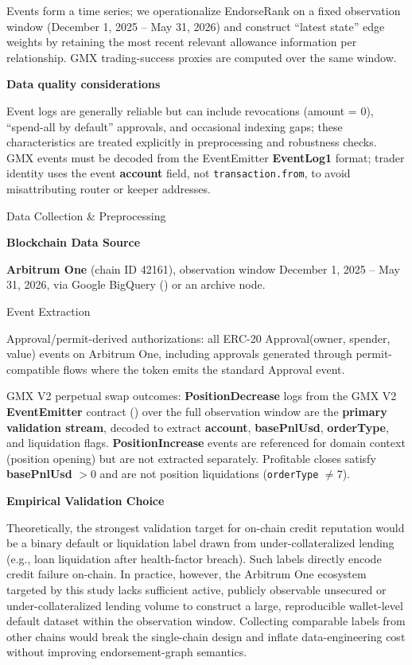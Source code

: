 Events form a time series; we operationalize EndorseRank on a fixed observation window (December 1, 2025 -- May 31, 2026) and construct ``latest state'' edge weights by retaining the most recent relevant allowance information per relationship. GMX trading-success proxies are computed over the same window.


\textbf{Data quality considerations}


Event logs are generally reliable but can include revocations (amount = 0), ``spend-all by default'' approvals, and occasional indexing gaps; these characteristics are treated explicitly in preprocessing and robustness checks. GMX events must be decoded from the EventEmitter \textbf{EventLog1} format; trader identity uses the event \textbf{account} field, not \texttt{transaction.from}, to avoid misattributing router or keeper addresses.


Data Collection \& Preprocessing


\textbf{Blockchain Data Source}


\textbf{Arbitrum One} (chain ID 42161), observation window December 1, 2025 -- May 31, 2026, via Google BigQuery () or an archive node.


Event Extraction


Approval/permit-derived authorizations: all ERC-20 Approval(owner, spender, value) events on Arbitrum One, including approvals generated through permit-compatible flows where the token emits the standard Approval event.


GMX V2 perpetual swap outcomes: \textbf{PositionDecrease} logs from the GMX V2 \textbf{EventEmitter} contract () over the full observation window are the \textbf{primary validation stream}, decoded to extract \textbf{account}, \textbf{basePnlUsd}, \textbf{orderType}, and liquidation flags. \textbf{PositionIncrease} events are referenced for domain context (position opening) but are not extracted separately. Profitable closes satisfy \textbf{basePnlUsd} $> 0$ and are not position liquidations (\texttt{orderType} $\neq 7$).


\textbf{Empirical Validation Choice}


Theoretically, the strongest validation target for on-chain credit reputation would be a binary default or liquidation label drawn from under-collateralized lending (e.g., loan liquidation after health-factor breach). Such labels directly encode credit failure on-chain. In practice, however, the Arbitrum One ecosystem targeted by this study lacks sufficient active, publicly observable unsecured or under-collateralized lending volume to construct a large, reproducible wallet-level default dataset within the observation window. Collecting comparable labels from other chains would break the single-chain design and inflate data-engineering cost without improving endorsement-graph semantics.


